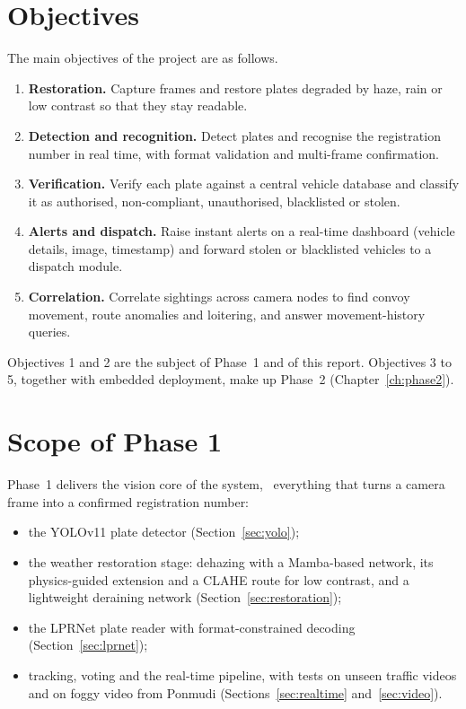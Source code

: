 \section{Objectives}

The main objectives of the project are as follows.
\begin{enumerate}
  \item \textbf{Restoration.} Capture frames and restore plates degraded by
        haze, rain or low contrast so that they stay readable.
  \item \textbf{Detection and recognition.} Detect plates and recognise the
        registration number in real time, with format validation and
        multi-frame confirmation.
  \item \textbf{Verification.} Verify each plate against a central vehicle
        database and classify it as authorised, non-compliant, unauthorised,
        blacklisted or stolen.
  \item \textbf{Alerts and dispatch.} Raise instant alerts on a real-time
        dashboard (vehicle details, image, timestamp) and forward stolen or
        blacklisted vehicles to a dispatch module.
  \item \textbf{Correlation.} Correlate sightings across camera nodes to find
        convoy movement, route anomalies and loitering, and answer
        movement-history queries.
\end{enumerate}
Objectives 1 and 2 are the subject of Phase~1 and of this report. Objectives 3
to 5, together with embedded deployment, make up Phase~2 (Chapter~\ref{ch:phase2}).

\section{Scope of Phase 1}

Phase~1 delivers the vision core of the system, \ie\ everything that turns a
camera frame into a confirmed registration number:
\begin{itemize}
  \item the YOLOv11 plate detector (Section~\ref{sec:yolo});
  \item the weather restoration stage: dehazing with a Mamba-based network,
        its physics-guided extension and a CLAHE route for low contrast, and
        a lightweight deraining network (Section~\ref{sec:restoration});
  \item the LPRNet plate reader with format-constrained decoding
        (Section~\ref{sec:lprnet});
  \item tracking, voting and the real-time pipeline, with tests on unseen
        traffic videos and on foggy video from Ponmudi
        (Sections~\ref{sec:realtime} and~\ref{sec:video}).
\end{itemize}

